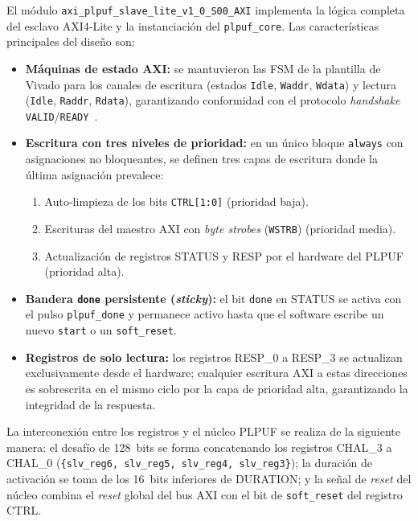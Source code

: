 El módulo \texttt{axi\_plpuf\_slave\_lite\_v1\_0\_S00\_AXI} implementa la
lógica completa del esclavo AXI4-Lite y la instanciación del
\texttt{plpuf\_core}. Las características principales del diseño son:

\begin{itemize}
  \item \textbf{Máquinas de estado AXI:} se mantuvieron las FSM de la
    plantilla de Vivado para los canales de escritura (estados \texttt{Idle},
    \texttt{Waddr}, \texttt{Wdata}) y lectura (\texttt{Idle}, \texttt{Raddr},
    \texttt{Rdata}), garantizando conformidad con el protocolo
    \textit{handshake} \texttt{VALID}/\texttt{READY}~\cite{ihi0022h}.

  \item \textbf{Escritura con tres niveles de prioridad:} en un único bloque
    \texttt{always} con asignaciones no bloqueantes, se definen tres capas de
    escritura donde la última asignación prevalece:
    \begin{enumerate}
      \item Auto-limpieza de los bits \texttt{CTRL[1:0]} (prioridad baja).
      \item Escrituras del maestro AXI con \textit{byte strobes}
        (\texttt{WSTRB}) (prioridad media).
      \item Actualización de registros STATUS y RESP por el hardware del
        PLPUF (prioridad alta).
    \end{enumerate}

  \item \textbf{Bandera \texttt{done} persistente (\textit{sticky}):} el bit
    \texttt{done} en STATUS se activa con el pulso \texttt{plpuf\_done} y
    permanece activo hasta que el software escribe un nuevo \texttt{start} o
    un \texttt{soft\_reset}.

  \item \textbf{Registros de solo lectura:} los registros RESP\_0 a RESP\_3
    se actualizan exclusivamente desde el hardware; cualquier escritura AXI a
    estas direcciones es sobrescrita en el mismo ciclo por la capa de
    prioridad alta, garantizando la integridad de la respuesta.
\end{itemize}

La interconexión entre los registros y el núcleo PLPUF se realiza de la
siguiente manera: el desafío de 128~bits se forma concatenando los registros
CHAL\_3 a CHAL\_0 (\texttt{\{slv\_reg6, slv\_reg5, slv\_reg4, slv\_reg3\}});
la duración de activación se toma de los 16~bits inferiores de DURATION; y la
señal de \textit{reset} del núcleo combina el \textit{reset} global del bus
AXI con el bit de \texttt{soft\_reset} del registro CTRL.

